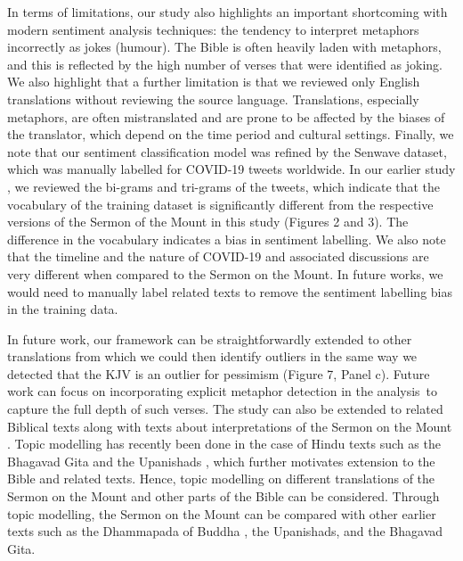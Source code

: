 \documentclass[5p,times]{elsarticle}
\begin{document}
In terms of limitations, our study also highlights an important shortcoming with modern sentiment analysis techniques:  the tendency to interpret metaphors incorrectly as jokes (humour). The Bible is often heavily laden with metaphors, and this is reflected by the high number of verses that were identified as joking. We also highlight that a further limitation is that we reviewed only English translations without reviewing the source language. Translations, especially metaphors, are often mistranslated and are prone to be affected by the biases of the translator, which depend on the  time period and cultural settings. Finally, we note that our sentiment classification model was refined by the Senwave dataset, which was manually labelled for COVID-19 tweets worldwide. In our earlier study \cite{chandra2021covid}, we reviewed the bi-grams and tri-grams of the tweets, which indicate that the vocabulary of the training dataset is significantly different from the respective versions of the Sermon of the Mount in this study (Figures 2 and 3). The difference in the vocabulary indicates a bias in sentiment labelling. We also note that the timeline and the nature of COVID-19 and associated discussions are very different when compared to the Sermon on the Mount. In future works, we would need to manually label related texts to remove the sentiment labelling bias in the training data. 

In future work, our framework can be straightforwardly extended to other translations from which we could then identify outliers in the same way we detected that the KJV is an outlier for pessimism (Figure 7, Panel c). Future work can focus on incorporating explicit metaphor detection \cite{tsvetkov2014metaphor,song2021verb} in the analysis\ to capture the full depth of such verses. The study can also be extended to related Biblical texts along with texts about interpretations of the Sermon on the Mount \cite{kissinger1975sermon}.  Topic modelling has recently been done in the case of Hindu texts such as the Bhagavad Gita and the Upanishads \cite{chandra2022artificial}, which further motivates extension to the Bible and related texts. Hence, topic modelling on different translations of the Sermon on the Mount and other parts of the Bible can be considered. Through topic modelling, the Sermon on the Mount can be compared with other earlier texts such as the Dhammapada of Buddha \cite{easwaran2007dhammapada}, the Upanishads, and the Bhagavad Gita. 
\end{document}
